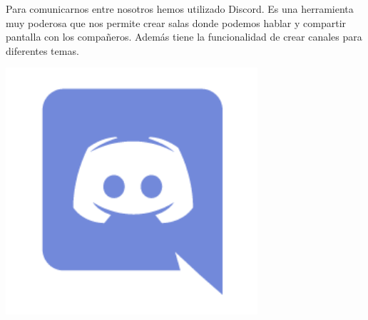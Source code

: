 \documentclass[12pt,a4paper]{article}
\begin{document}
\begin{minipage}{.75\textwidth}

Para comunicarnos entre nosotros hemos utilizado Discord. Es una herramienta muy poderosa que nos permite crear salas donde podemos hablar y compartir pantalla con los compañeros. Además tiene la funcionalidad de crear canales para diferentes temas.


\end{minipage} %
\begin{minipage}{.25\textwidth}
  \includegraphics[width=0.7\textwidth, right]{discord}
\end{minipage}
\end{document}

